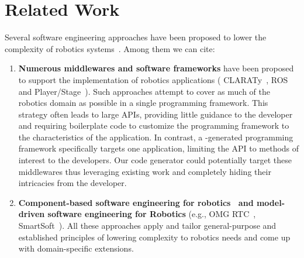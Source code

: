 
\section{Related Work}
\label{sec:related}

Several software engineering approaches have been proposed to lower
the complexity of robotics systems~\cite{Brug07a}. Among them we can cite:

\begin{enumerate}
\item {\bf Numerous middlewares and software frameworks} have been proposed to
support the implementation of robotics applications (\eg{}
CLARATy~\cite{Claraty}, ROS~\cite{ROS} and Player/Stage~\cite{Coll05a}).
Such approaches attempt to cover as much of the robotics domain as
possible in a single programming framework. This strategy often leads
to large APIs, providing little guidance to the developer and
requiring boilerplate code to customize the programming framework to
the characteristics of the application. In contrast, a
\diaspec{}-generated programming framework specifically targets one
application, limiting the API to methods of interest to the
developers. Our code generator could potentially target these
middlewares thus leveraging existing work and completely hiding their
intricacies from the developer.

\item {\bf Component-based software engineering for robotics~\cite{Brug07b} and
model-driven software engineering for Robotics} (e.g., OMG
RTC~\cite{OMGRTC}, SmartSoft~\cite{Schl09a}). All these approaches
apply and tailor general-purpose and established principles of
lowering complexity to robotics needs and come up with domain-specific
extensions.


\end{enumerate}
